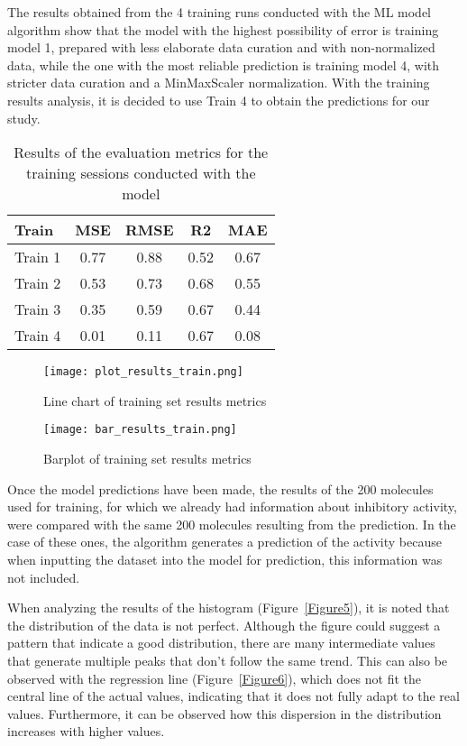 \documentclass[final,times,twocolumn,article]{elsarticle}
\begin{document}
The results obtained from the 4 training runs conducted with the ML model algorithm show that the model with the highest possibility of error is training model 1, prepared with less elaborate data curation and with non-normalized data, while the one with the most reliable prediction is training model 4, with stricter data curation and a MinMaxScaler normalization. With the training results analysis, it is decided to use Train 4 to obtain the predictions for our study. 

\begin{table}[ht]
    \centering
    \begin{tabular}{l c c c c} 
         \hline
         Train & MSE & RMSE & R2 & MAE\\ 
         \hline
         Train 1 & 0.77 & 0.88 & 0.52 & 0.67\\
         \hline
         Train 2 & 0.53 & 0.73 & 0.68 & 0.55\\
         \hline
         Train 3 & 0.35 & 0.59 & 0.67 & 0.44\\ 
         \hline
         Train 4 & 0.01 & 0.11 & 0.67 & 0.08\\ 
         \hline
        \end{tabular}
    \caption{Results of the evaluation metrics for the training sessions conducted with the model}
    \label{Table2}
    \end{table}
 
 \begin{figure}[ht]
     \centering 
      \texttt{[image: plot\_results\_train.png]}	
      \caption{Line chart of training set results metrics} 
      \label{Figure3}
  \end{figure}
 
  \begin{figure}[ht]
     \centering 
      \texttt{[image: bar\_results\_train.png]}	
      \caption{Barplot of training set results metrics} 
      \label{Figure4}
  \end{figure}

Once the model predictions have been made, the results of the 200 molecules used for training, for which we already had information about inhibitory activity, were compared with the same 200 molecules resulting from the prediction. In the case of these ones, the algorithm generates a prediction of the activity because when inputting the dataset into the model for prediction, this information was not included. 

When analyzing the results of the histogram (Figure~\ref{Figure5}), it is noted that the distribution of the data is not perfect. Although the figure could suggest a pattern that indicate a good distribution, there are many intermediate values that generate multiple peaks that don't follow the same trend. This can also be observed with the regression line (Figure~\ref{Figure6}), which does not fit the central line of the actual values, indicating that it does not fully adapt to the real values. Furthermore, it can be observed how this dispersion in the distribution increases with higher values. 
\end{document}
